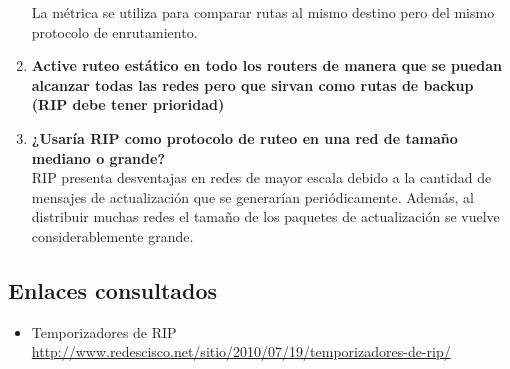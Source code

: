 \documentclass[letterpaper,12pt]{article}
\begin{document}
\begin{enumerate}
		La métrica se utiliza para comparar rutas al mismo destino pero del mismo protocolo de enrutamiento.
		\item \textbf{Active ruteo estático en todo los routers de manera que  se puedan alcanzar todas las redes pero que sirvan como rutas de backup (RIP debe tener prioridad)}
		\item \textbf{¿Usaría RIP como protocolo de ruteo en una red de tamaño mediano o grande?} \\
		RIP presenta desventajas en redes de mayor escala debido a la cantidad de mensajes de actualización que se generarían periódicamente. Además, al distribuir muchas redes el tamaño de los paquetes de actualización se vuelve considerablemente grande. 
	\end{enumerate}
	\subsection{Enlaces consultados}
	\begin{itemize}
		\item{Temporizadores de RIP}  \\
		\url{http://www.redescisco.net/sitio/2010/07/19/temporizadores-de-rip/}
	\end{itemize}
	
\end{document}
